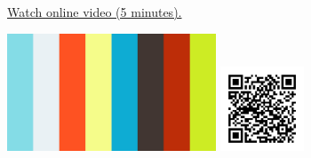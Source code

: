 
\begin{minipage}{10cm}
    \href{https://act4e-spring21.netlify.app/videos/spring2021-monads-a:monad-def.html}{Watch online video (5 minutes).}
        
    \href{https://act4e-spring21.netlify.app/videos/spring2021-monads-a:monad-def.html}{\includegraphics[height=3.5cm]{spring2021-monads-a:monad-def/thumbnails.jpg}}
    \href{https://act4e-spring21.netlify.app/videos/spring2021-monads-a:monad-def.html}{\includegraphics[height=2.5cm]{spring2021-monads-a:monad-def/qrcode.png}}
\end{minipage}

